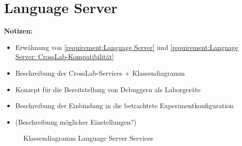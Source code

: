 \section{Language Server}\label{section:konzeption:language-server}

\begin{note}
    \textbf{Notizen:}
    \begin{itemize}
        \item Erwähnung von \autoref{requirement:Language Server} und \autoref{requirement:Language Server: CrossLab-Kompatibilität}
        \item Beschreibung der CrossLab-Services + Klassendiagramm
        \item Konzept für die Bereitstellung von Debuggern als Laborgeräte
        \item Beschreibung der Einbindung in die betrachtete Experimentkonfiguration
        \item (Beschreibung möglicher Einstellungen?)
    \end{itemize}
\end{note}

\begin{figure}[tbp]
    \centering
    \caption{Klassendiagramm Language Server Services}
    \label{figure:klassendiagramm-language-server-services}
\end{figure}


